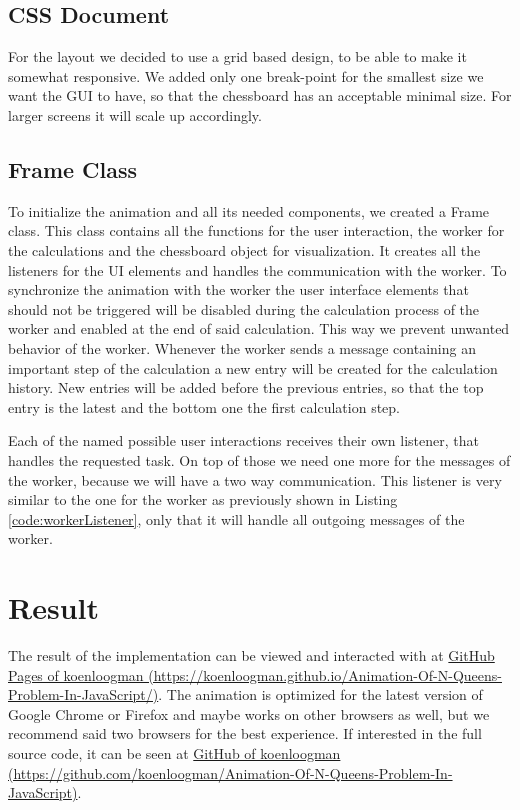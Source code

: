 \subsection{CSS Document}
\label{sub:impCSS}
For the layout we decided to use a grid based design, to be able to make it somewhat responsive. We added only one break-point for the smallest size we want the GUI to have, so that the chessboard has an acceptable minimal size. For larger screens it will scale up accordingly.

\subsection{Frame Class}
\label{sub:impFrame}
To initialize the animation and all its needed components, we created a Frame class. This class contains all the functions for the user interaction, the worker for the calculations and the chessboard object for visualization. It creates all the listeners for the UI elements and handles the communication with the worker. To synchronize the animation with the worker the user interface elements that should not be triggered will be disabled during the calculation process of the worker and enabled at the end of said calculation. This way we prevent unwanted behavior of the worker. Whenever the worker sends a message containing an important step of the calculation a new entry will be created for the calculation history. New entries will be added before the previous entries, so that the top entry is the latest and the bottom one the first calculation step.

Each of the named possible user interactions receives their own listener, that handles the requested task. On top of those we need one more for the messages of the worker, because we will have a two way communication. This listener is very similar to the one for the worker as previously shown in Listing \ref{code:workerListener}, only that it will handle all outgoing messages of the worker.

\section{Result}
\label{sub:impResult}
The result of the implementation can be viewed and interacted with at \href{https://koenloogman.github.io/Animation-Of-N-Queens-Problem-In-JavaScript/}{GitHub Pages of koenloogman (https://koenloogman.github.io/Animation-Of-N-Queens-Problem-In-JavaScript/)}. The animation is optimized for the latest version of Google Chrome or Firefox and maybe works on other browsers as well, but we recommend said two browsers for the best experience. If interested in the full source code, it can be seen at \href{https://github.com/koenloogman/Animation-Of-N-Queens-Problem-In-JavaScript}{GitHub of koenloogman (https://github.com/koenloogman/Animation-Of-N-Queens-Problem-In-JavaScript)}.